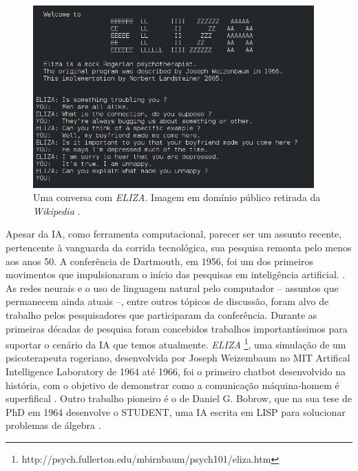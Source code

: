 \documentclass[12pt, a4paper]{article}
\begin{document}
\begin{figure}[ht!]
	\centering
	\includegraphics[width=\textwidth, height=7cm, keepaspectratio=true]{fig/eliza}
	\caption{
		Uma conversa com \emph{ELIZA}. Imagem em domínio público retirada da \emph{Wikipedia}
		\cite{wikipedia_eliza}.
	}
\end{figure}

Apesar da IA, como ferramenta computacional, parecer ser um assunto recente, 
pertencente à vanguarda da corrida tecnológica, sua pesquisa
remonta pelo menos aos anos 50.
A conferência de Dartmouth, em 1956, foi um dos primeiros movimentos que impulsionaram o início das 
pesquisas em inteligência artificial. \cite{dartmouth}.
As redes neurais e o uso de linguagem natural pelo computador -- assuntos que permanecem ainda atuais --, entre outros tópicos de discussão,
foram alvo de trabalho pelos pesquisadores que participaram da conferência. 
Durante as primeiras décadas de pesquisa foram concebidos trabalhos importantíssimos para suportar o cenário da IA que temos atualmente.
\emph{ELIZA} \footnote{http://psych.fullerton.edu/mbirnbaum/psych101/eliza.htm}, 
uma simulação de um psicoterapeuta rogeriano, desenvolvida por Joseph Weizembaum no MIT Artifical Intelligence Laboratory de 1964 até 1966,
foi o primeiro chatbot desenvolvido na história, com o objetivo de demonstrar como a comunicação máquina-homem é superfifical \cite{wiezembaum}.
Outro trabalho pioneiro é o de Daniel G. Bobrow, que na sua tese de PhD em 1964 desenvolve o STUDENT, uma IA escrita em LISP para solucionar problemas
de álgebra \cite{student}.
\end{document}
